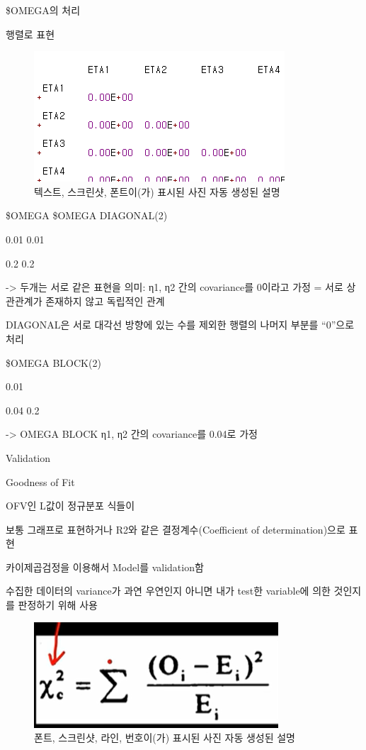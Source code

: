 \documentclass[
]{article}
\begin{document}
\$OMEGA의 처리

행렬로 표현

\begin{figure}
\centering
\includegraphics{media/cf6501f83dc79c8737bd55f222da8b6b.png}
\caption{텍스트, 스크린샷, 폰트이(가) 표시된 사진 자동 생성된 설명}
\end{figure}

\$OMEGA \$OMEGA DIAGONAL(2)

0.01 0.01

0.2 0.2

-\textgreater{} 두개는 서로 같은 표현을 의미: η1, η2 간의 covariance를
0이라고 가정 = 서로 상관관계가 존재하지 않고 독립적인 관계

DIAGONAL은 서로 대각선 방향에 있는 수를 제외한 행렬의 나머지 부분를
``0''으로 처리

\$OMEGA BLOCK(2)

0.01

0.04 0.2

-\textgreater{} OMEGA BLOCK η1, η2 간의 covariance를 0.04로 가정

Validation

Goodness of Fit

OFV인 L값이 정규분포 식들이

보통 그래프로 표현하거나 R2와 같은 결정계수(Coefficient of
determination)으로 표현

카이제곱검정을 이용해서 Model를 validation함

수집한 데이터의 variance가 과연 우연인지 아니면 내가 test한 variable에
의한 것인지를 판정하기 위해 사용

\begin{figure}
\centering
\includegraphics{media/fcc8230c2ddfc64a7503dbf0cc69cb20.png}
\caption{폰트, 스크린샷, 라인, 번호이(가) 표시된 사진 자동 생성된 설명}
\end{figure}
\end{document}
